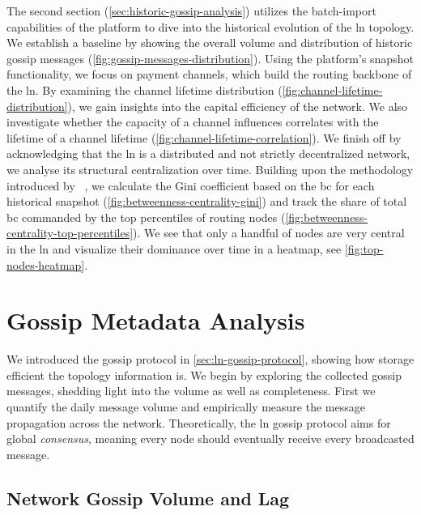 The second section (\autoref{sec:historic-gossip-analysis}) utilizes the batch-import 
capabilities of the platform to dive into the historical evolution of the \gls{ln} topology. 
We establish a baseline by showing the overall volume and distribution of historic gossip messages (\autoref{fig:gossip-messages-distribution}). 
Using the platform's snapshot functionality, we focus on payment channels, 
which build the routing backbone of the \gls{ln}. 
By examining the channel lifetime distribution (\autoref{fig:channel-lifetime-distribution}), 
we gain insights into the capital efficiency of the network. 
We also investigate whether the capacity of a channel influences correlates 
with the lifetime of a channel lifetime (\autoref{fig:channel-lifetime-correlation}). 
We finish off by acknowledging that the \gls{ln} is a distributed and not strictly decentralized network, 
we analyse its structural centralization over time. 
Building upon the methodology introduced by \citeauthor{zabka_short_2022}~\cite{zabka_short_2022}, 
we calculate the Gini coefficient based on the \gls{bc} for each historical snapshot (\autoref{fig:betweenness-centrality-gini}) 
and track the share of total \gls{bc} commanded by the top percentiles of routing nodes (\autoref{fig:betweenness-centrality-top-percentiles}).
We see that only a handful of nodes are very central in the \gls{ln} and visualize their
dominance over time in a heatmap, see \autoref{fig:top-nodes-heatmap}.


\section{Gossip Metadata Analysis}
\label{sec:metadata-analysis}

We introduced the gossip protocol in \autoref{sec:ln-gossip-protocol}, showing 
how storage efficient the topology information is. 
We begin by exploring the collected gossip messages, shedding light into the volume
as well as completeness.
First we quantify the daily message volume and empirically measure the message propagation across the network. 
Theoretically, the \gls{ln} gossip protocol aims for global \textit{consensus}, 
meaning every node should eventually receive every broadcasted message.


\subsection{Network Gossip Volume and Lag}

